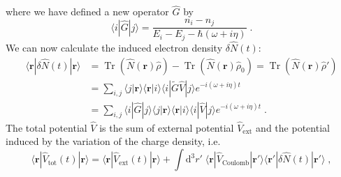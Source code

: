 \documentclass[a4paper,12pt]{article}
\begin{document}
    where we have defined a new operator $\hat G$ by 
    \begin{equation} \label{eq:qm:g_function}
        \langle i | \hat G | j \rangle = \frac{n_i - n_j}{E_i - E_j - \hbar(\omega + i\eta)} \; .
    \end{equation}
    We can now calculate the induced electron density $\delta\hat N(t)$:
    \begin{equation} \label{eq:qm:chi_function_t}
    \begin{aligned}
        \langle \mathbf{r} | \delta\hat N(t) | \mathbf{r} \rangle
            &= \operatorname{Tr}(\hat N(\mathbf{r}) \hat\rho) - \operatorname{Tr}(\hat N(\mathbf{r}) \hat\rho_0) = \operatorname{Tr}(\hat N(\mathbf{r})\hat\rho') \\
            &= \sum_{i,j} \langle j|\mathbf{r}\rangle \langle\mathbf{r}| i\rangle \langle i| \widetilde G \hat V | j \rangle e^{-i (\omega + i\eta) t} \\
            &= \sum_{i,j} \langle i | \hat G | j \rangle \langle j|\mathbf{r}\rangle \langle\mathbf{r}| i\rangle \langle i| \hat V | j \rangle e^{-i (\omega + i\eta) t} \; .
    \end{aligned}
    \end{equation}
    The total potential $\hat V$ is the sum of external potential $\hat V_\text{ext}$ and the potential induced by the variation of the charge density, i.e.
    \begin{equation} \label{eq:qm:self_consistency_t}
        \langle \mathbf{r} | \hat V_\text{tot}(t) | \mathbf{r} \rangle
            = \langle \mathbf{r} | \hat V_\text{ext}(t) | \mathbf{r} \rangle + \int\!\! \text{d}^3 r' \; \langle \mathbf{r} | \hat V_\text{Coulomb} | \mathbf{r'} \rangle \langle \mathbf{r'} | \delta\hat N(t) | \mathbf{r'} \rangle \; ,
    \end{equation}
\end{document}
